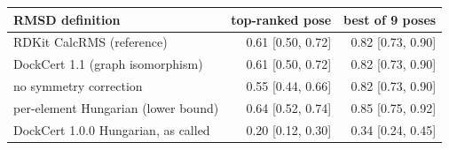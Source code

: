 \begin{tabular}{lrr}
\toprule
RMSD definition & top-ranked pose & best of 9 poses \\
\midrule
RDKit CalcRMS (reference) & 0.61 [0.50, 0.72] & 0.82 [0.73, 0.90] \\
DockCert 1.1 (graph isomorphism) & 0.61 [0.50, 0.72] & 0.82 [0.73, 0.90] \\
no symmetry correction & 0.55 [0.44, 0.66] & 0.82 [0.73, 0.90] \\
per-element Hungarian (lower bound) & 0.64 [0.52, 0.74] & 0.85 [0.75, 0.92] \\
DockCert 1.0.0 Hungarian, as called & 0.20 [0.12, 0.30] & 0.34 [0.24, 0.45] \\
\bottomrule
\end{tabular}
